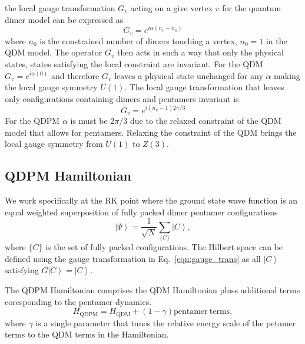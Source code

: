 \documentclass[twocolumn,prb,aps,floatfix,superscriptaddress]{revtex4-1}
\begin{document}
        the local gauge transformation $G_v$ acting on a give vertex $v$ for the quantum dimer model
        can be expressed as
        \begin{equation}
            \label{}
            G_v=e^{i \alpha (n_v - n_0)}
        \end{equation}
        where $n_0$ is the constrained number of dimers touching a vertex, $n_0=1$ in the QDM model,
        The operator $G_v$ then acts in such a
        way that only the physical states, states satisfying the local constraint 
        are invariant. For the QDM $G_v =
        e^{i\alpha (0)}$ and therefore $G_v$ leaves a physical state unchanged for any
        $\alpha$ making the local gauge symmetry $U(1)$. The local gauge transformation that leaves
        only configurations containing dimers and pentamers invariant is
        \begin{equation}
            \label{eqn:gauge_trans}
            G_v = e^{i (\hat{n}_v -1) 2\pi/3}    
        \end{equation}
        For the QDPM $\alpha$ is must be $2\pi/3$ due to the relaxed constraint of the QDM
        model that allows for pentamers. Relaxing the constraint of the QDM brings the local gauge
        symmetry from $U(1)$ to $Z(3)$.

    \subsection{QDPM Hamiltonian}

        We work specifically at the RK point where the ground state wave function
        is an equal weighted superposition of fully packed dimer pentamer configurations
        \begin{equation}
            \label{}
            \left| \Psi \right\rangle = \frac{1}{\sqrt{N}}\sum_{\{C\}} \left| C \right\rangle
            ,
        \end{equation}
        where $\{C\}$ is the set of fully packed configurations. The Hilbert space can be defined
        using the gauge transformation in Eq.~\ref{eqn:gauge_trans} as all $\left| C \right\rangle$
        satisfying $G \left| C \right\rangle = \left| C \right\rangle$.

        The QDPM Hamiltonian comprises the QDM Hamiltonian pluss additional terms coresponding to
        the pentamer dynamics.
        \begin{equation}
            H_{\mathrm{QDPM}} = H_{\mathrm{QDM}} + (1-\gamma)\mathrm{pentamer\ terms}
            ,
        \end{equation}
        where $\gamma$ is a single parameter that tunes the relative energy scale of the petamer
        terms to the QDM terms in the Hamiltonian.
\end{document}
